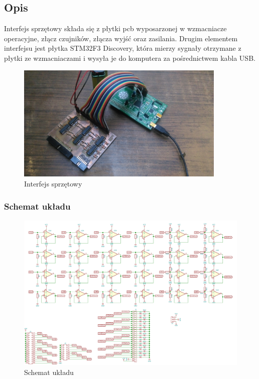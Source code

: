 \documentclass{article}
\begin{document}
\subsection{Opis}
Interfejs sprzętowy składa się z płytki pcb wyposarzonej w wzmacniacze operacyjne, złącz czujników, złącza wyjść oraz zasilania. 
Drugim elementem interfejsu jest płytka STM32F3 Discovery, która mierzy sygnały otrzymane z płytki ze wzmacniaczami i wysyła je do komputera za pośrednictwem kabla USB.
\begin{figure}[H]
	\centering
	\includegraphics[width=10cm]{interfejs+discovery.jpg}
	\caption{Interfejs sprzętowy}
	\label{rys:interfejs_sprzetowy}
\end{figure}

\subsubsection{Schemat układu}

\begin{figure}[H]
	\centering
	\includegraphics[width=14cm]{schemat.png}
	\caption{Schemat układu}
	\label{rys:schemat_ukladu}
\end{figure}
\end{document}
